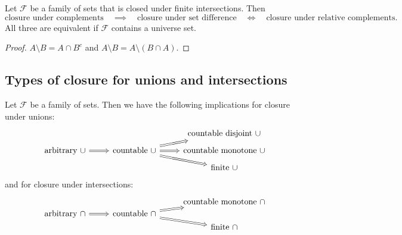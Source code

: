 \begin{lemma}
Let $\mathcal{F}$ be a family of sets that is closed under finite intersections. Then
\[ \text{closure under complements} \quad\implies\quad \text{closure under set difference} \quad\iff\quad \text{closure under relative complements.} \]
All three are equivalent if $\mathcal{F}$ contains a universe set.
\end{lemma}
\begin{proof}
$A\setminus B = A\cap B^c$ and $A\setminus B = A\setminus (B\cap A)$.
\end{proof}

\subsection{Types of closure for unions and intersections}
\begin{lemma} \label{lemma:unionsIntersectionClosureImplications}
Let $\mathcal{F}$ be a family of sets. Then we have the following implications for closure under unions:
\[ \begin{tikzcd}[row sep=tiny]
&& \text{countable disjoint $\cup$} \\
\text{arbitrary $\cup$} \arrow[r, Rightarrow] & \text{countable $\cup$} \arrow[ur, Rightarrow] \arrow[r, Rightarrow] \arrow[dr, Rightarrow] & \text{countable monotone $\cup$} \\
&& \text{finite $\cup$}
\end{tikzcd} \]
and for closure under intersections:
\[ \begin{tikzcd}[row sep=0em]
&& \text{countable monotone $\cap$} \\
\text{arbitrary $\cap$} \arrow[r, Rightarrow] & \text{countable $\cap$} \arrow[ur, Rightarrow] \arrow[dr, Rightarrow] &  \\
&& \text{finite $\cap$}
\end{tikzcd} \]
\end{lemma}


